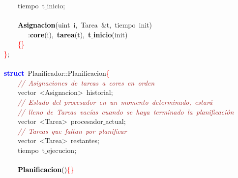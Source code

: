 \mbox{}\ \ \ \ \textcolor{TealBlue}{tiempo}\ t$\_$inicio\textcolor{BrickRed}{;} \\
\mbox{} \\
\mbox{}\ \ \ \ \textbf{\textcolor{Black}{Asignacion}}\textcolor{BrickRed}{(}\textcolor{TealBlue}{uint}\ i\textcolor{BrickRed}{,}\ \textcolor{TealBlue}{Tarea}\ \textcolor{BrickRed}{\&}t\textcolor{BrickRed}{,}\ \textcolor{TealBlue}{tiempo}\ init\textcolor{BrickRed}{)} \\
\mbox{}\ \ \ \ \ \ \ \textcolor{BrickRed}{:}\textbf{\textcolor{Black}{core}}\textcolor{BrickRed}{(}i\textcolor{BrickRed}{),}\ \textbf{\textcolor{Black}{tarea}}\textcolor{BrickRed}{(}t\textcolor{BrickRed}{),}\ \textbf{\textcolor{Black}{t$\_$inicio}}\textcolor{BrickRed}{(}init\textcolor{BrickRed}{)} \\
\mbox{}\ \ \ \ \textcolor{Red}{\{\}} \\
\mbox{}\textcolor{Red}{\}}\textcolor{BrickRed}{;} \\
\mbox{} \\
\mbox{}\textbf{\textcolor{Blue}{struct}}\ \textcolor{TealBlue}{Planificador}\textcolor{BrickRed}{::}Planificacion\textcolor{Red}{\{} \\
\mbox{}\ \ \ \ \textit{\textcolor{Brown}{//\ Asignaciones\ de\ tareas\ a\ cores\ en\ orden}} \\
\mbox{}\ \ \ \ vector\ \textcolor{BrickRed}{\textless{}}Asignacion\textcolor{BrickRed}{\textgreater{}}\ historial\textcolor{BrickRed}{;} \\
\mbox{}\ \ \ \ \textit{\textcolor{Brown}{//\ Estado\ del\ procesador\ en\ un\ momento\ determinado,\ estará}} \\
\mbox{}\ \ \ \ \textit{\textcolor{Brown}{//\ lleno\ de\ Tareas\ vacías\ cuando\ se\ haya\ terminado\ la\ planificación}} \\
\mbox{}\ \ \ \ vector\ \textcolor{BrickRed}{\textless{}}Tarea\textcolor{BrickRed}{\textgreater{}}\ procesador$\_$actual\textcolor{BrickRed}{;} \\
\mbox{}\ \ \ \ \textit{\textcolor{Brown}{//\ Tareas\ que\ faltan\ por\ planificar}} \\
\mbox{}\ \ \ \ vector\ \textcolor{BrickRed}{\textless{}}Tarea\textcolor{BrickRed}{\textgreater{}}\ restantes\textcolor{BrickRed}{;} \\
\mbox{}\ \ \ \ \textcolor{TealBlue}{tiempo}\ t$\_$ejecucion\textcolor{BrickRed}{;} \\
\mbox{} \\
\mbox{}\ \ \ \ \textbf{\textcolor{Black}{Planificacion}}\textcolor{BrickRed}{()}\textcolor{Red}{\{\}} \\
